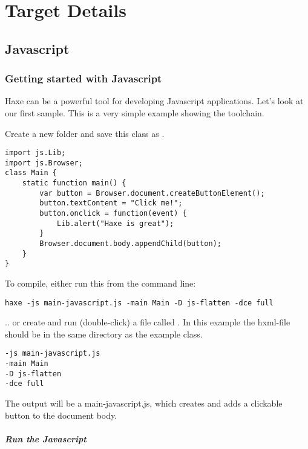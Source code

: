 \chapter{Target Details}
\label{target-details}

\section{Javascript}
\label{target-javascript}

\subsection{Getting started with Javascript}
\label{target-javascript-getting-started}

Haxe can be a powerful tool for developing Javascript applications. Let's look at our first sample.
This is a very simple example showing the toolchain. 

Create a new folder and save this class as .

\begin{lstlisting}
import js.Lib;
import js.Browser;
class Main {
    static function main() {
        var button = Browser.document.createButtonElement();
        button.textContent = "Click me!";
        button.onclick = function(event) {
            Lib.alert("Haxe is great");
        }
        Browser.document.body.appendChild(button);
    }
}
\end{lstlisting}

To compile, either run this from the command line:

\begin{lstlisting}
haxe -js main-javascript.js -main Main -D js-flatten -dce full
\end{lstlisting}

.. or create and run (double-click) a file called . In this example the hxml-file should be in the same directory as the example class.

\begin{lstlisting}
-js main-javascript.js
-main Main
-D js-flatten
-dce full
\end{lstlisting}

The output will be a main-javascript.js, which creates and adds a clickable button to the document body.

\paragraph{Run the Javascript}

